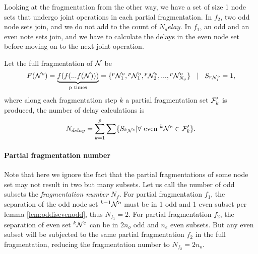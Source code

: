 Looking at the fragmentation from the other way, we have a set of size 1 node sets that undergo joint operations in each partial fragmentation. In $f_2$, two odd node sets join, and we do not add to the count of $N_delay$. In $f_1$, an odd and an even note sets join, and we have to calculate the delays in the even node set before moving on to the next joint operation.

\begin{lemma}
  Let the full fragmentation of $\mathcal{N}$ be
  \begin{equation}\label{eq:fullfrag}
    F(\mathcal{N}^o) = \underbrace{f(f(...f(\mathcal{N})))}_\text{p times} = \{{}^{p}\mathcal{N}^{o}_1, {}^{p}\mathcal{N}^{o}_1, {}^{p}\mathcal{N}^{o}_2, ... ,{}^{p}\mathcal{N}^{o}_{N_\sigma} \} \hspace{.3cm} | \hspace{.3cm} S_{{}^{p}\mathcal{N}^{o}_i} = 1,
  \end{equation}
  where along each fragmentation step $k$ a partial fragmentation set $\mathcal{F}'_k$ is produced, the number of delay calculations is
  \begin{equation}\label{eq:maxdelay}
    N_{delay} = \sum_{k=1}^{p} \sum \{ S_{{}^{k}\mathcal{N}^e} | \forall \mbox{ even } {}^{k}\mathcal{N}^e \in \mathcal{F}'_k \}.
  \end{equation}
\end{lemma}

\paragraph{Partial fragmentation number} 
Note that here we ignore the fact that the partial fragmentations of some node set may not result in two but many subsets. Let us call the number of odd subsets the \emph{fragmentation number} $N_f$. For partial fragmentation $f_1$, the separation of the odd node set ${}^{k-1}\mathcal{N}^o$ must be in 1 odd and 1 even subset per lemma \ref{lem:oddisevenodd}, thus $N_{f_1} = 2$. For partial fragmentation $f_2$, the separation of even set ${}^{k}\mathcal{N}^e$ can be in $2n_o$ odd and $n_e$ even subsets. But any even subset will be subjected to the same partial fragmentation $f_2$ in the full fragmentation, reducing the fragmentation number to $N_{f_2} = 2n_o$.

